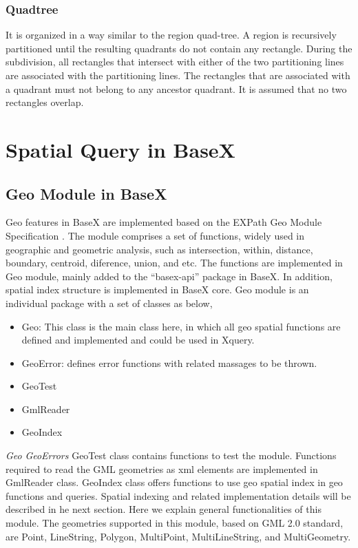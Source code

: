 \documentclass[a4paper,12pt]{article}
\begin{document}
\subsubsection{Quadtree}
It is organized in a way similar to the region quad-tree. A region is recursively partitioned until the resulting quadrants do not contain any rectangle. During the subdivision, all rectangles that intersect with either of the two partitioning lines are associated with the partitioning lines. The rectangles that are associated with a quadrant must not belong to any ancestor quadrant. It is assumed that no two rectangles overlap.
\newpage








\section{Spatial Query in BaseX}
\subsection{Geo Module in BaseX}
Geo features in BaseX are implemented based on the EXPath Geo Module Specification \cite{expath}. The module comprises a set of functions, widely used in geographic and geometric analysis, such as intersection, within, distance, boundary, centroid, diference, union, and etc. The functions are implemented in Geo module, mainly added to the “basex-api” package in BaseX. In addition, spatial index structure is implemented in BaseX core. Geo module is an individual package with a set of classes as below,
\begin{itemize}
\item Geo: This class is the main class here, in which all geo spatial functions are defined and implemented and could be used in Xquery.
\item GeoError: defines error functions with related massages to be thrown.
\item GeoTest
\item GmlReader
\item GeoIndex
\end{itemize}

\textit{Geo}  \textit{GeoErrors}  GeoTest class contains functions to test the module. Functions required to read the GML geometries as xml elements are implemented in GmlReader class.  GeoIndex class offers functions to use geo spatial index in geo functions and queries. Spatial indexing and related implementation details will be described in he next section. Here we explain general functionalities of this module.
The geometries supported in this module, based on GML 2.0 standard, are Point, LineString, Polygon, MultiPoint, MultiLineString, and MultiGeometry. 
\end{document}
